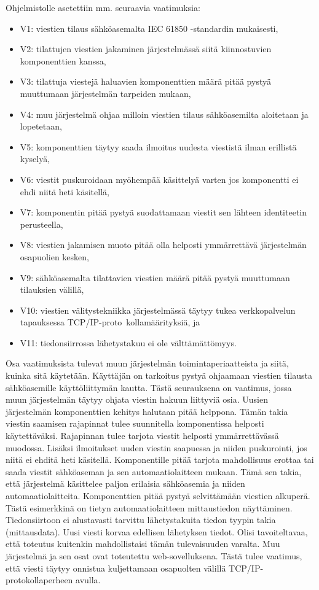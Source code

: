 Ohjelmistolle asetettiin mm. seuraavia vaatimuksia:
\begin{itemize}
	\item V1: viestien tilaus sähköasemalta IEC 61850 -standardin mukaisesti,
	\item V2: tilattujen viestien jakaminen järjestelmässä siitä kiinnostuvien komponenttien kanssa,
	\item V3: tilattuja viestejä haluavien komponenttien määrä pitää pystyä muuttumaan järjestelmän tarpeiden mukaan,
	\item V4: muu järjestelmä ohjaa milloin viestien tilaus sähköasemilta aloitetaan ja lopetetaan,
	\item V5: komponenttien täytyy saada ilmoitus uudesta viestistä ilman erillistä kyselyä,
	\item V6: viestit puskuroidaan myöhempää käsittelyä varten jos komponentti ei ehdi niitä heti käsitellä,
	\item V7: komponentin pitää pystyä suodattamaan viestit sen lähteen identiteetin perusteella,
	\item V8: viestien jakamisen muoto pitää olla helposti ymmärrettävä järjestelmän osapuolien kesken,
	\item V9: sähköasemalta tilattavien viestien määrä pitää pystyä muuttumaan tilauksien välillä,
	\item V10: viestien välitystekniikka järjestelmässä täytyy tukea verkkopalvelun tapauksessa TCP/IP-pro\-to \-kol\-la\-mää\-ri\-tyk\-si\-ä, ja
	\item V11: tiedonsiirrossa lähetystakuu ei ole välttämättömyys.
\end{itemize}

Osa vaatimuksista tulevat muun järjestelmän toimintaperiaatteista ja siitä, kuinka sitä käytetään. Käyttäjän on tarkoitus pystyä ohjaamaan viestien tilausta sähköasemille käyttöliittymän kautta. Tästä seurauksena on vaatimus, jossa muun järjestelmän täytyy ohjata viestin hakuun liittyviä osia. Uusien järjestelmän komponenttien kehitys halutaan pitää helppona. Tämän takia viestin saamisen rajapinnat tulee suunnitella komponentissa helposti käytettäväksi. Rajapinnan tulee tarjota viestit helposti ymmärrettävässä muodossa. Lisäksi ilmoitukset uuden viestin saapuessa ja niiden puskurointi, jos niitä ei ehditä heti käsitellä. Komponentille pitää tarjota mahdollisuus erottaa tai saada viestit sähköaseman ja sen automaatiolaitteen mukaan. Tämä sen takia, että järjestelmä käsittelee paljon erilaisia sähköasemia ja niiden automaatiolaitteita. Komponenttien pitää pystyä selvittämään viestien alkuperä. Tästä esimerkkinä on tietyn automaatiolaitteen mittaustiedon näyttäminen. Tiedonsiirtoon ei alustavasti tarvittu lähetystakuita tiedon tyypin takia (mittausdata). Uusi viesti korvaa edellisen lähetyksen tiedot. Olisi tavoiteltavaa, että toteutus kuitenkin mahdollistaisi tämän tulevaisuuden varalta. Muu järjestelmä ja sen osat ovat toteutettu web-sovelluksena. Tästä tulee vaatimus, että viesti täytyy onnistua kuljettamaan osapuolten välillä TCP/IP-protokollaperheen avulla.


